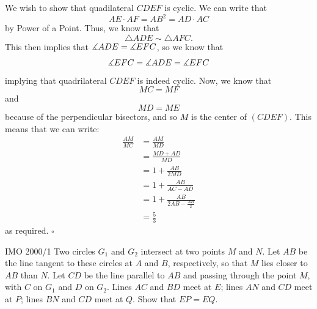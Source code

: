 \documentclass{article}
\begin{document}
We wish to show that quadilateral $CDEF$ is cyclic. We can write that \[AE\cdot AF = AB^2 = AD \cdot AC\] by Power of a Point. Thus, we know that \[\triangle ADE \sim \triangle AFC.\] This then implies that $\measuredangle ADE = \measuredangle EFC$, so we know that \[\measuredangle EFC = \measuredangle ADE = \measuredangle EFC\] implying that quadrilateral $CDEF$ is indeed cyclic. Now, we know that \[MC = MF\] and \[MD = ME\] because of the perpendicular bisectors, and so $M$ is the center of $(CDEF)$. This means that we can write:
\begin{align*}
\frac{AM}{MC} &= \frac{AM}{MD} \\
&= \frac{MD+AD}{MD} \\
&= 1+\frac{AB}{2MD} \\
&= 1+\frac{AB}{AC-AD} \\
&= 1+\frac{AB}{2AB-\tfrac{AB}{2}} \\
&= \boxed{\frac{5}{3}}
\end{align*}
as required. $\square$

\begin{problem}[2.33]{IMO 2000/1}
Two circles $G_1$ and $G_2$ intersect at two points $M$ and $N$. Let $AB$ be the line tangent to these circles at $A$ and $B$, respectively, so that $M$ lies closer to $AB$ than $N$. Let $CD$ be the line parallel to $AB$ and passing through the point $M$, with $C$ on $G_1$ and $D$ on $G_2$. Lines $AC$ and $BD$ meet at $E$; lines $AN$ and $CD$ meet at $P$; lines $BN$ and $CD$ meet at $Q$. Show that $EP = EQ$.
\end{problem}
\end{document}
